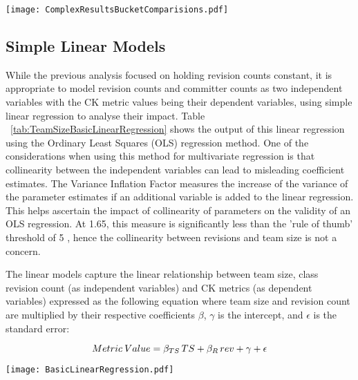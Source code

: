 \begin{table}
\centering 
\caption{Tabular summary showing the results of each bucket comparison within the sample.}
\begin{tabular}
 \centering 
 \texttt{[image: ComplexResultsBucketComparisions.pdf]}
 \label{tab:ComplexResultsBucketComparisions}
\end{tabular}
\end{table}

\subsection{Simple Linear Models}
While the previous analysis focused on holding revision counts constant, it is appropriate to model revision counts and committer counts as two independent variables with the CK metric values being their dependent variables, using simple linear regression to analyse their impact. Table ~\ref{tab:TeamSizeBasicLinearRegression} shows the output of this linear regression using the Ordinary Least Squares (OLS) regression method. One of the considerations when using this method for multivariate regression is that collinearity between the independent variables can lead to misleading coefficient estimates. The Variance Inflation Factor measures the increase of the variance of the parameter estimates if an additional variable is added to the linear regression. This helps ascertain the impact of collinearity of parameters on the validity of an OLS regression. At 1.65, this measure is significantly less than the 'rule of thumb' threshold of 5 \citep{menard2002applied}, hence the collinearity between revisions and team size is not a concern.

The linear models capture the linear relationship between team size, class revision count (as independent variables) and CK metrics (as dependent variables) expressed as the following equation where team size and revision count are multiplied by their respective coefficients $\beta$, $\gamma$ is the intercept, and $\epsilon$ is the standard error:

\[\large Metric \: Value = \beta_{TS}\, TS +  \beta_{R}\, rev +  \gamma + \epsilon \]

\begin{table}
\centering 
{}
\begin{tabular}
 \centering 
 \texttt{[image: BasicLinearRegression.pdf]}
 \label{tab:TeamSizeBasicLinearRegression}
\end{tabular}
\end{table}

